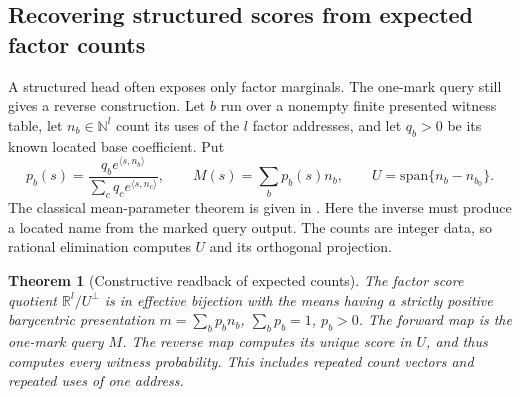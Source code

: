 \documentclass[11pt,a4paper]{article}
\newtheorem{theorem}{Theorem}[section]
\theoremstyle{definition}
\theoremstyle{remark}\newaliascnt{remark}{theorem}
\newcommand{\N}{\mathbb N}
\newcommand{\R}{\mathbb R}
\numberwithin{equation}{section}
\begin{document}
\subsection{Recovering structured scores from expected factor counts}
A structured head often exposes only factor marginals. The one-mark query still gives a reverse construction. Let $b$ run over a nonempty finite presented witness table, let $n_b\in\N^l$ count its uses of the $l$ factor addresses, and let $q_b>0$ be its known located base coefficient. Put
\[
 p_b(s)=\frac{q_b e^{\langle s,n_b\rangle}}
                 {\sum_cq_c e^{\langle s,n_c\rangle}},\qquad
 M(s)=\sum_b p_b(s)n_b,\qquad
 U=\mathrm{span}\{n_b-n_{b_0}\}.
\]
The classical mean-parameter theorem is given in \cite[Theorem 3.3]{wj-mean}. Here the inverse must produce a located name from the marked query output. The counts are integer data, so rational elimination computes $U$ and its orthogonal projection.
\begin{theorem}[Constructive readback of expected counts]\label{thm:mean-inverse}
The factor score quotient $\R^l/U^\perp$ is in effective bijection with the means having a strictly positive barycentric presentation
$m=\sum_b p_b n_b$, $\sum_b p_b=1$, $p_b>0$.
The forward map is the one-mark query $M$. The reverse map computes its unique score in $U$, and thus computes every witness probability. This includes repeated count vectors and repeated uses of one address.
\end{theorem}
\end{document}
